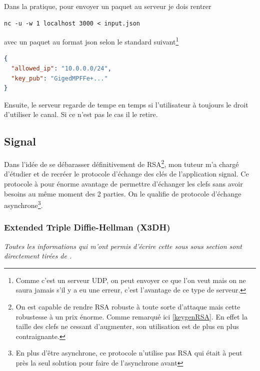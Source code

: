 \documentclass[a4paper, 12pt]{article}
\begin{document}
\noindent Dans la pratique, pour envoyer un paquet au serveur je dois rentrer 
\begin{center}
\begin{minipage}{.67\linewidth}
\begin{lstlisting}[language = shell]
nc -u -w 1 localhost 3000 < input.json
\end{lstlisting}
\end{minipage}
\end{center}
avec un paquet au format json selon le standard suivant\footnote{Comme c'est un serveur UDP, on peut envoyer ce que l'on veut mais on ne saura jamais s'il y a eu une erreur, c'est l'avantage de ce type de serveur.}
\begin{center}
\begin{minipage}{.51\linewidth}
\begin{lstlisting}[language = json]
{
  "allowed_ip": "10.0.0.0/24", 
  "key_pub": "GigedMPFFe+..."
}
\end{lstlisting}
\end{minipage}
\end{center}
Ensuite, le serveur regarde de tempe en temps si l'utilisateur à toujours le droit d'utiliser le canal. Si ce n'est pas le cas il le retire.

\subsection{Signal}
Dans l'idée de se débarasser définitivement de RSA\footnote{On est capable de rendre RSA robuste à toute sorte d'attaque mais cette robustesse à un prix énorme. Comme remarqué ici \ref{keygenRSA}. En effet la taille des clefs ne cessant d'augmenter, son utilisation est de plus en plus contraignante.}, mon tuteur m'a chargé d'étudier et de recréer le protocole d'échange des clés de l'application signal. Ce protocole à pour énorme avantage de permettre d'échanger les clefs sans avoir besoins au même moment des 2 parties. On le qualifie de protocole d'échange asynchrone\footnote{En plus d'être asynchrone, ce protocole n'utilise pas RSA qui était à peut près la seul solution pour faire de l'asynchrone avant}.

\subsubsection{Extended Triple Diffie-Hellman (X3DH)}
\noindent\emph{Toutes les informations qui m'ont permis d'écrire cette sous sous section sont directement tirées de \cite{xtroisdh}.}\\
\end{document}
